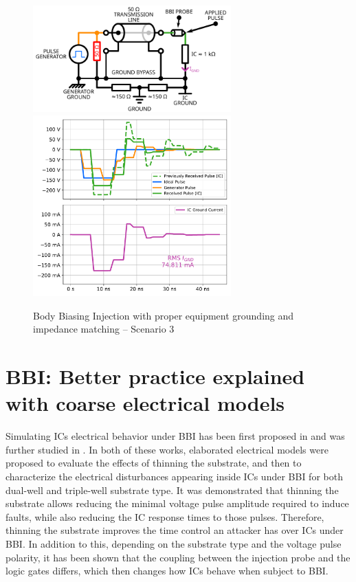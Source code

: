 \documentclass[10pt, conference, compsocconf]{IEEEtran}
\begin{document}
\begin{figure}[hbtp]
\centering
\includegraphics[width=3in]{model2Probe}
\includegraphics[width=3in]{SIMPLE_BBI_2.pdf}
\caption{Body Biasing Injection with proper equipment grounding and impedance matching – Scenario 3}
\label{simpleModel2}
\end{figure}

\section{BBI: Better practice explained with coarse electrical models}
\label{section:simpleModel}
Simulating ICs electrical behavior under BBI has been first proposed in \cite{mybbi1} and was further studied in \cite{mybbi2}.
In both of these works, elaborated electrical models were proposed to evaluate the effects of thinning the substrate, and then to characterize the electrical disturbances appearing inside ICs under BBI for both dual-well and triple-well substrate type.
It was demonstrated that thinning the substrate allows reducing the minimal voltage pulse amplitude required to induce faults, while also reducing the IC response times to those pulses.
Therefore, thinning the substrate improves the time control an attacker has over ICs under BBI.
In addition to this, depending on the substrate type and the voltage pulse polarity, it has been shown that the coupling between the injection probe and the logic gates differs, which then changes how ICs behave when subject to BBI.
\end{document}
